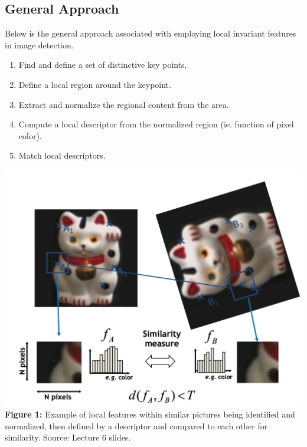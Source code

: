 \documentclass{article}
\begin{document}
\subsection{General Approach}
Below is the general approach associated with employing local invariant features in image detection.
\begin{enumerate}
\item Find and define a set of distinctive key points.
\item Define a local region around the keypoint.
\item Extract and normalize the regional content from the area.
\item Compute a local descriptor from the normalized region (ie. function of pixel color).
\item Match local descriptors.
\end{enumerate}
\begin{center}
	\includegraphics[scale=0.5]{local_feature_ex.png}\\
  	\textbf{Figure 1:} Example of local features within similar pictures being identified and normalized, then defined by a descriptor and compared to each other for similarity. Source: Lecture 6 slides. \\
\end{center}
\end{document}
